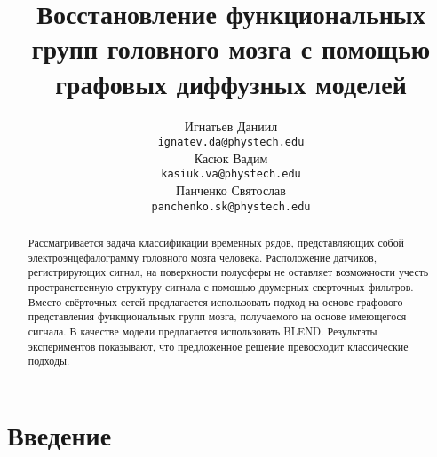 \documentclass{article}
\title{Восстановление функциональных групп головного мозга с помощью графовых диффузных моделей}
\author{
    Игнатьев Даниил \\
	\texttt{ignatev.da@phystech.edu} \\
	\And
	Касюк Вадим \\
	\texttt{kasiuk.va@phystech.edu} \\
	\And
	Панченко Святослав \\
	\texttt{panchenko.sk@phystech.edu}
}
\date{}
\begin{document}
\maketitle

\begin{abstract}
Рассматривается задача классификации временных рядов, представляющих собой электроэнцефалограмму головного мозга человека. Расположение датчиков, регистрирующих сигнал, на поверхности полусферы не оставляет возможности учесть пространственную структуру сигнала с помощью двумерных сверточных фильтров. Вместо свёрточных сетей предлагается использовать подход на основе графового представления функциональных групп мозга, получаемого на основе имеющегося сигнала. В качестве модели предлагается использовать BLEND. Результаты экспериментов показывают, что предложенное решение превосходит классические подходы.

\end{abstract}



\section{Введение}


%
\end{document}
